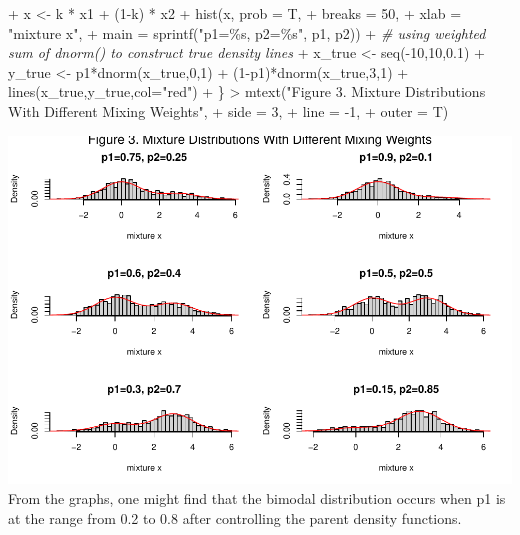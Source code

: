 \documentclass[
]{article}
\newenvironment{Shaded}{\begin{snugshade}}{\end{snugshade}}
\newcommand{\AttributeTok}[1]{\textcolor[rgb]{0.77,0.63,0.00}{#1}}
\newcommand{\CommentTok}[1]{\textcolor[rgb]{0.56,0.35,0.01}{\textit{#1}}}
\newcommand{\DecValTok}[1]{\textcolor[rgb]{0.00,0.00,0.81}{#1}}
\newcommand{\FloatTok}[1]{\textcolor[rgb]{0.00,0.00,0.81}{#1}}
\newcommand{\FunctionTok}[1]{\textcolor[rgb]{0.00,0.00,0.00}{#1}}
\newcommand{\NormalTok}[1]{#1}
\newcommand{\OtherTok}[1]{\textcolor[rgb]{0.56,0.35,0.01}{#1}}
\newcommand{\SpecialCharTok}[1]{\textcolor[rgb]{0.00,0.00,0.00}{#1}}
\newcommand{\StringTok}[1]{\textcolor[rgb]{0.31,0.60,0.02}{#1}}
\begin{document}
\begin{Shaded}
\begin{Highlighting}[]
\SpecialCharTok{+}\NormalTok{   x }\OtherTok{\textless{}{-}}\NormalTok{ k }\SpecialCharTok{*}\NormalTok{ x1 }\SpecialCharTok{+}\NormalTok{ (}\DecValTok{1}\SpecialCharTok{{-}}\NormalTok{k) }\SpecialCharTok{*}\NormalTok{ x2}
\SpecialCharTok{+}   \FunctionTok{hist}\NormalTok{(x, }\AttributeTok{prob =}\NormalTok{ T, }
\SpecialCharTok{+}        \AttributeTok{breaks =} \DecValTok{50}\NormalTok{, }
\SpecialCharTok{+}        \AttributeTok{xlab =} \StringTok{"mixture x"}\NormalTok{,}
\SpecialCharTok{+}        \AttributeTok{main =} \FunctionTok{sprintf}\NormalTok{(}\StringTok{"p1=\%s, p2=\%s"}\NormalTok{, p1, p2))}
\SpecialCharTok{+}   \CommentTok{\# using weighted sum of dnorm() to construct true density lines}
\SpecialCharTok{+}\NormalTok{   x\_true }\OtherTok{\textless{}{-}} \FunctionTok{seq}\NormalTok{(}\SpecialCharTok{{-}}\DecValTok{10}\NormalTok{,}\DecValTok{10}\NormalTok{,}\FloatTok{0.1}\NormalTok{)}
\SpecialCharTok{+}\NormalTok{   y\_true }\OtherTok{\textless{}{-}}\NormalTok{ p1}\SpecialCharTok{*}\FunctionTok{dnorm}\NormalTok{(x\_true,}\DecValTok{0}\NormalTok{,}\DecValTok{1}\NormalTok{) }\SpecialCharTok{+}\NormalTok{ (}\DecValTok{1}\SpecialCharTok{{-}}\NormalTok{p1)}\SpecialCharTok{*}\FunctionTok{dnorm}\NormalTok{(x\_true,}\DecValTok{3}\NormalTok{,}\DecValTok{1}\NormalTok{)}
\SpecialCharTok{+}   \FunctionTok{lines}\NormalTok{(x\_true,y\_true,}\AttributeTok{col=}\StringTok{"red"}\NormalTok{)}
\SpecialCharTok{+}\NormalTok{ \}}
\SpecialCharTok{\textgreater{}} \FunctionTok{mtext}\NormalTok{(}\StringTok{"Figure 3. Mixture Distributions With Different Mixing Weights"}\NormalTok{,}
\SpecialCharTok{+}       \AttributeTok{side =} \DecValTok{3}\NormalTok{,}
\SpecialCharTok{+}       \AttributeTok{line =} \SpecialCharTok{{-}}\DecValTok{1}\NormalTok{,}
\SpecialCharTok{+}       \AttributeTok{outer =}\NormalTok{ T)}
\end{Highlighting}
\end{Shaded}

\includegraphics{HW_02_Chenguang_Pan_files/figure-latex/unnamed-chunk-4-1.pdf}
From the graphs, one might find that the bimodal distribution occurs
when p1 is at the range from 0.2 to 0.8 after controlling the parent
density functions.
\end{document}
